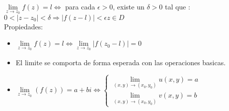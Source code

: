 \documentclass[12pt,a4paper]{article}
\begin{document}
   $\lim\limits_{z \to z_{0}}f(z)=l \Leftrightarrow $ para cada $\epsilon >0$, existe un $\delta > 0$ tal que :\\
    \hspace*{3cm} $ 0<|z-z_{0}|<\delta\Rightarrow |f(z-l)| < \epsilon z\in D$\\
    Propiedades:
    \begin{itemize}
        \item  $\lim\limits_{z \to z_{0}}f(z)=l \Leftrightarrow  \lim\limits_{z \to z_{0}}|f(z_{0}-l)|=0  $
        \item El limite se comporta de forma esperada con las operaciones basicas.
        \item $\lim\limits_{z \to z_{0}}(f(z))=a+bi \Leftrightarrow \begin{cases}
            \lim\limits_{(x,y) \to (x_{0},y_{0})}u(x,y)=a\\
            \lim\limits_{(x,y) \to (x_{0},y_{0})}v(x,y)=b
        \end{cases} $
    \end{itemize}   
\end{document}
